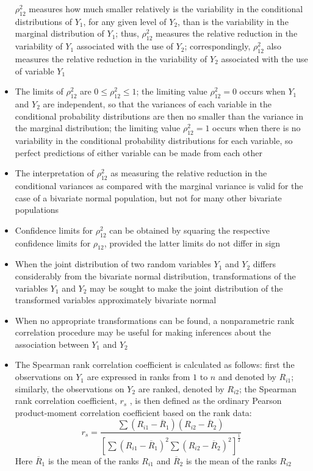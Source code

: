 \begin{itemize}
$\rho^2_{12}$ measures how much smaller relatively is the variability in the conditional distributions of $Y_1$, for any given level of $Y_2$, than is the variability in the marginal distribution of $Y_1$; thus, $\rho^2_{12}$ measures the relative reduction in the variability of $Y_1$ associated with the use of $Y_2$; correspondingly, $\rho^2_{12}$ also measures the relative reduction in the variability of $Y_2$ associated with the use of variable $Y_1$
\item The limits of $\rho^2_{12}$ are $0 \leq \rho^2_{12} \leq 1$; the limiting value $\rho^2_{12} = 0$ occurs when $Y_1$ and $Y_2$ are independent, so that the variances of each variable in the conditional probability distributions are then no smaller than the variance in the marginal distribution; the limiting value $\rho^2_{12} = 1$ occurs when there is no variability in the conditional probability distributions for each variable, so perfect predictions of either variable can be made from each other 
\item The interpretation of $\rho^2_{12}$ as measuring the relative reduction in the conditional variances as compared with the marginal variance is valid for the case of a bivariate normal population, but not for many other bivariate populations
\item Confidence limits for $\rho^2_{12}$ can be obtained by squaring the respective confidence limits for $\rho_{12}$, provided the latter limits do not differ in sign
\item When the joint distribution of two random variables $Y_1$ and $Y_2$ differs considerably from the bivariate normal distribution, transformations of the variables $Y_1$ and $Y_2$ may be sought to make the joint distribution of the transformed variables approximately bivariate normal
\item When no appropriate transformations can be found, a nonparametric rank correlation procedure may be useful for making inferences about the association between $Y_1$ and $Y_2$
\item The Spearman rank correlation coefficient is calculated as follows: first the observations on $Y_1$ are expressed in ranks from $1$ to $n$ and denoted by $R_{i1}$; similarly, the observations on $Y_2$ are ranked, denoted by $R_{i2}$; the Spearman rank correlation coefficient, $r_s$ , is then defined as the ordinary Pearson product-moment correlation coefficient based on the rank data: $$ r_s = \frac{\sum (R_{i1} - \overline{R}_1)(R_{i2} - \overline{R}_2)}{[\sum (R_{i1} - \overline{R}_1)^2 \sum (R_{i2} - \overline{R}_2)^2]^{\frac{1}{2}}} $$ Here $\overline{R}_1$ is the mean of the ranks $R_{i1}$ and $\overline{R}_2$ is the mean of the ranks $R_{i2}$

\end{itemize}
